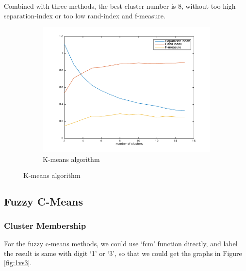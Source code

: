 \documentclass[]{article}
\begin{document}
Combined with three methods, the best cluster number is 8, without too high separation-index or too low rand-index and f-measure.


\begin{figure}[h]
	\centering
	\begin{subfigure}{.9\textwidth}
		\centering
		\includegraphics[width=1\linewidth]{../images-update/2-(2)-3.png}
		\caption{K-means algorithm}
		\label{fig:kmeans}
	\end{subfigure}
	
	
	
\end{figure}



\subsection{Fuzzy C-Means}


\subsubsection{Cluster Membership}

For the fuzzy c-means methods, we could use `fcm' function directly, and label the result is same with digit `1' or `3', so that we could get the graphs in Figure \ref{fig:1vs3}.
\end{document}
